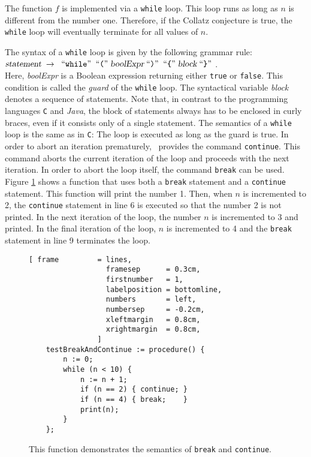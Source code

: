 The function $f$ is implemented via a \texttt{while} loop.  This loop runs as long as $n$
is different from the number one.  Therefore, if the Collatz conjecture is true, the \texttt{while}
loop will eventually terminate for all values of $n$.

The syntax of a \texttt{while} loop is given by the following
grammar rule:
\\[0.2cm]
\hspace*{1.3cm}
$\textsl{statement} \;\rightarrow\; \;\mbox{``\texttt{while}''}\; \;\mbox{``\texttt{(}''}\; \textsl{boolExpr} \;\mbox{``\texttt{)}''}\;
 \;\mbox{``\texttt{\{}''}\;  \textsl{block} \;\mbox{``\texttt{\}}''}\; 
$.
\\[0.2cm]
Here, \textsl{boolExpr} is a Boolean expression returning either \texttt{true} or
\texttt{false}.  This condition is called the \emph{guard} of the \texttt{while} loop.
The syntactical variable \textsl{block} denotes a sequence of statements.  Note that, 
in contrast to the programming languages \texttt{C} and \textsl{Java}, the
block of statements always has to be enclosed in curly braces, even if it consists only of a
single statement.  The semantics of a \texttt{while} loop is the same as in \texttt{C}:
The loop is executed as long as the guard is true.  In order to abort an iteration
prematurely, \setlx\ provides the command \texttt{continue}.  This command aborts the
current iteration of the loop and proceeds with the next iteration.  In order to abort the
loop itself, the command \texttt{break} can be used.  Figure \ref{fig:break-and-continue.stlx} shows
a function that uses both a \texttt{break} statement and a \texttt{continue} statement.  This
function will print the number 1.  Then, when $n$ is incremented to 2, the \texttt{continue}
statement in line 6 is executed so that the number 2 is not printed.  In the next iteration of the
loop, the number $n$ is incremented to 3 and printed.  In the final iteration of the loop, $n$ is
incremented to 4 and the \texttt{break} statement in line 9 terminates the loop.


\begin{figure}[!ht]
\centering
\begin{Verbatim}[ frame         = lines, 
                  framesep      = 0.3cm, 
                  firstnumber   = 1,
                  labelposition = bottomline,
                  numbers       = left,
                  numbersep     = -0.2cm,
                  xleftmargin   = 0.8cm,
                  xrightmargin  = 0.8cm,
                ]
    testBreakAndContinue := procedure() {
        n := 0;
        while (n < 10) {
            n := n + 1;
            if (n == 2) { continue; }
            if (n == 4) { break;    }
            print(n);
        }
    };
\end{Verbatim}
\vspace*{-0.3cm}
\caption{This function demonstrates the semantics of \texttt{break} and \texttt{continue}.}
\label{fig:break-and-continue.stlx}
\end{figure}


